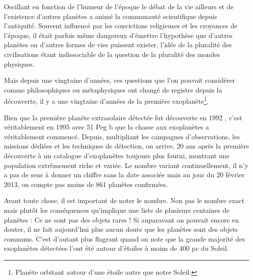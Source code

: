 

Oscillant en fonction de l'humeur de l'époque le débat de la vie ailleurs et de l'existence d'autres planètes a animé la communauté scientifique depuis l'antiquité. Souvent influencé par les convictions religieuses et les croyances de l'époque, il était parfois même dangereux d'émettre l'hypothèse que d'autres planètes ou d'autres formes de vies puissent exister, l'idée de la pluralité des civilisations étant indissociable de la question de la pluralité des mondes physiques. %

Mais depuis une vingtaine d'années, ces questions que l'on pouvait considérer comme philosophiques ou métaphysiques ont changé de registre depuis la découverte, il y a une vingtaine d'années de la première exoplanète\footnote{Planète orbitant autour d'une étoile autre que notre Soleil.}.

Bien que la première planète extrasolaire détectée fut découverte en 1992 \citep{1992Natur.355..145W}, c'est véritablement en 1995 avec 51 Peg b%
 \citep{1995Natur.378..355M} que la chasse aux exoplanètes a véritablement commencé. Depuis, multipliant les campagnes d'observations, les missions dédiées et les techniques de détection, on arrive, 20 ans après la première découverte à un catalogue d'exoplanètes toujours plus fourni, montrant une population extrêmement riche et variée. Le nombre variant continuellement, il n'y a pas de sens à donner un chiffre sans la date associée mais au jour du 20 février 2013, on compte pas moins de 861 planètes confirmées. 

Avant toute chose, il est important de noter le nombre. Non pas le nombre exact mais plutôt les conséquences qu'implique une liste de plusieurs centaines de planètes : Ce ne sont pas des objets rares ! Si auparavant on pouvait encore en douter, il ne fait aujourd'hui plus aucun doute que les planètes sont des objets communs. C'est d'autant plus flagrant quand on note que la grande majorité des exoplanètes détectées l'ont été autour d'étoiles à moins de 400 pc du Soleil. 

